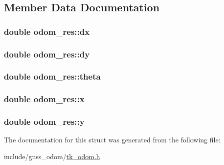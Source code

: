 \subsection{Member Data Documentation}
\hypertarget{structodom__res_a250da3293782566b13c36dea857daae4}{
\subsubsection[{dx}]{\setlength{\rightskip}{0pt plus 5cm}double odom\-\_\-res\-::dx}}\label{structodom__res_a250da3293782566b13c36dea857daae4}
\hypertarget{structodom__res_ad7a86edbf53b1a7ef27936157c86f9b6}{
\subsubsection[{dy}]{\setlength{\rightskip}{0pt plus 5cm}double odom\-\_\-res\-::dy}}\label{structodom__res_ad7a86edbf53b1a7ef27936157c86f9b6}
\hypertarget{structodom__res_a1d410479a6e91c2e919749d15b7f2a7f}{
\subsubsection[{theta}]{\setlength{\rightskip}{0pt plus 5cm}double odom\-\_\-res\-::theta}}\label{structodom__res_a1d410479a6e91c2e919749d15b7f2a7f}
\hypertarget{structodom__res_a60afe2ad94e3c314eeffb0a063428b01}{
\subsubsection[{x}]{\setlength{\rightskip}{0pt plus 5cm}double odom\-\_\-res\-::x}}\label{structodom__res_a60afe2ad94e3c314eeffb0a063428b01}
\hypertarget{structodom__res_a74ab1edf7b0122c94377a32779834e5f}{
\subsubsection[{y}]{\setlength{\rightskip}{0pt plus 5cm}double odom\-\_\-res\-::y}}\label{structodom__res_a74ab1edf7b0122c94377a32779834e5f}


The documentation for this struct was generated from the following file\-:\begin{DoxyCompactItemize}
\item 
include/gnss\-\_\-odom/\hyperlink{tk__odom_8h}{tk\-\_\-odom.\-h}\end{DoxyCompactItemize}
